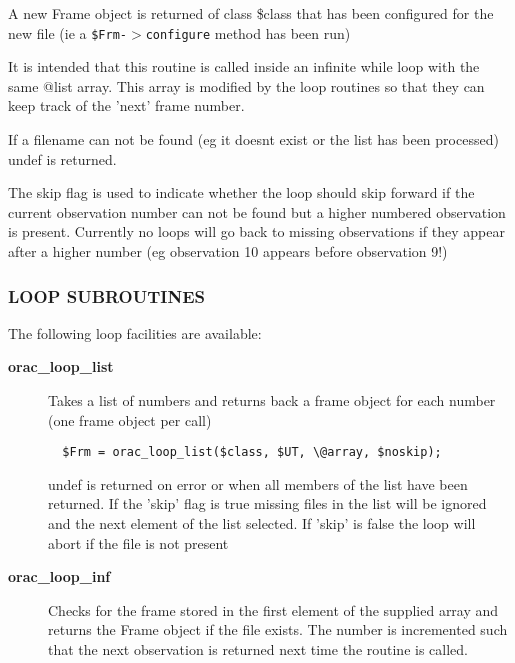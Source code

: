 \begin{description}
A new  Frame object is returned of class \$class that has been configured
for the new file (ie a \texttt{\$Frm-$>$configure} method has been run)



It is intended that this routine is called inside an infinite while
loop with the same @list array. This array is modified by the loop
routines so that they can keep track of the 'next' frame number.



If a filename can not be found (eg it doesnt exist or the list has
been processed) undef is returned.



The skip flag is used to indicate whether the loop should skip
forward if the current observation number can not be found
but a higher numbered observation is present. Currently no loops
will go back to missing observations if they appear after a higher
number (eg observation 10 appears before observation 9!)

\subsubsection*{LOOP SUBROUTINES\label{ORAC::Loop_LOOP_SUBROUTINES}}


The following loop facilities are available:

\begin{description}

\item[{\textbf{orac\_loop\_list}}] \mbox{}

Takes a list of numbers and returns back a frame object 
for each number (one frame object per call)

\begin{verbatim}
  $Frm = orac_loop_list($class, $UT, \@array, $noskip);
\end{verbatim}


undef is returned on error or when all members of the
list have been returned. If the 'skip' flag is true
missing files in the list will be ignored and the next
element of the list selected. If 'skip' is false
the loop will abort if the file is not present


\item[{\textbf{orac\_loop\_inf}}] \mbox{}

Checks for the frame stored in the first element of the supplied array
and returns the Frame object if the file exists. The number is incremented
such that the next observation is returned next time the routine is
called.


\end{description}
\end{description}

